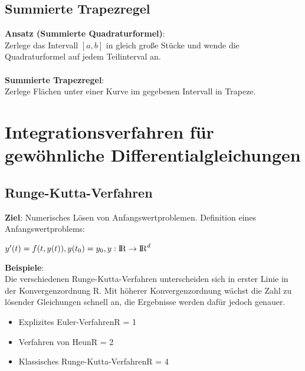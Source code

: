 \documentclass[10pt,a4paper]{article}
\def\realnumbers{{\rm I\!R}}
\begin{document}
	\subsection{Summierte Trapezregel}
	\textbf{Ansatz (Summierte Quadraturformel)}:\\Zerlege das Intervall $[a, b]$ in gleich große Stücke und wende die Quadraturformel auf jedem Teilinterval an.\\\\
	\textbf{Summierte Trapezregel}:\\Zerlege Flächen unter einer Kurve im gegebenen Intervall in Trapeze.

	\newpage
	\section{Integrationsverfahren für gewöhnliche Differentialgleichungen}
	\subsection{Runge-Kutta-Verfahren}
	\textbf{Ziel}: Numerisches Lösen von Anfangswertproblemen. Definition eines Anfangswertproblems:
	\begin{center} 
		$y'(t) = f(t, y(t)), y(t_0) = y_0, y: \realnumbers \rightarrow \realnumbers^d$
	\end{center}
	\textbf{Beispiele}:\\
	Die verschiedenen Runge-Kutta-Verfahren unterscheiden sich in erster Linie in der Konvergenzordnung R. Mit höherer Konvergenzordnung wächst die Zahl zu lösender Gleichungen schnell an, die Ergebnisse werden dafür jedoch genauer.
	\begin{itemize}
		\item Explizites Euler-Verfahren\hfill R = 1
		\item Verfahren von Heun\hfill R = 2
		\item Klassisches Runge-Kutta-Verfahren\hfill R = 4
	\end{itemize}
\end{document}
